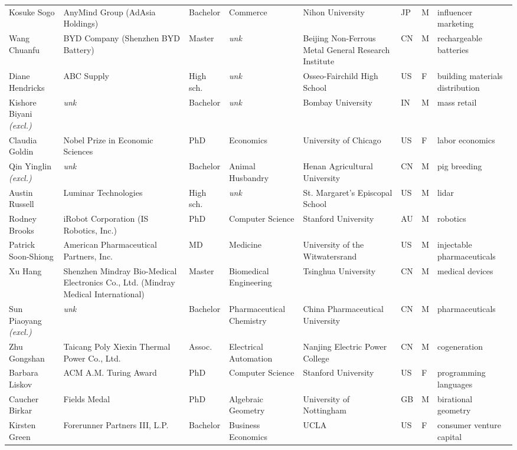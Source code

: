 \documentclass[11pt]{article}
\begin{document}
\begin{longtable}{@{}p{2.4cm}p{2.5cm}p{1.35cm}p{1.9cm}p{2.1cm}p{0.5cm}p{0.45cm}p{2.2cm}@{}}
Kosuke Sogo & AnyMind Group (AdAsia Holdings) & Bachelor & Commerce & Nihon University & JP & M & influencer marketing \\
Wang Chuanfu & BYD Company (Shenzhen BYD Battery) & Master & \textit{unk} & Beijing Non-Ferrous Metal General Research Institute & CN & M & rechargeable batteries \\
Diane Hendricks & ABC Supply & High sch. & \textit{unk} & Osseo-Fairchild High School & US & F & building materials distribution \\
Kishore Biyani \textit{\scriptsize(excl.)} & \textit{unk} & Bachelor & \textit{unk} & Bombay University & IN & M & mass retail \\
Claudia Goldin & Nobel Prize in Economic Sciences & PhD & Economics & University of Chicago & US & F & labor economics \\
Qin Yinglin \textit{\scriptsize(excl.)} & \textit{unk} & Bachelor & Animal Husbandry & Henan Agricultural University & CN & M & pig breeding \\
Austin Russell & Luminar Technologies & High sch. & \textit{unk} & St. Margaret's Episcopal School & US & M & lidar \\
Rodney Brooks & iRobot Corporation (IS Robotics, Inc.) & PhD & Computer Science & Stanford University & AU & M & robotics \\
Patrick Soon-Shiong & American Pharmaceutical Partners, Inc. & MD & Medicine & University of the Witwatersrand & US & M & injectable pharmaceuticals \\
Xu Hang & Shenzhen Mindray Bio-Medical Electronics Co., Ltd. (Mindray Medical International) & Master & Biomedical Engineering & Tsinghua University & CN & M & medical devices \\
Sun Piaoyang \textit{\scriptsize(excl.)} & \textit{unk} & Bachelor & Pharmaceutical Chemistry & China Pharmaceutical University & CN & M & pharmaceuticals \\
Zhu Gongshan & Taicang Poly Xiexin Thermal Power Co., Ltd. & Assoc. & Electrical Automation & Nanjing Electric Power College & CN & M & cogeneration \\
Barbara Liskov & ACM A.M. Turing Award & PhD & Computer Science & Stanford University & US & F & programming languages \\
Caucher Birkar & Fields Medal & PhD & Algebraic Geometry & University of Nottingham & GB & M & birational geometry \\
Kirsten Green & Forerunner Partners III, L.P. & Bachelor & Business Economics & UCLA & US & F & consumer venture capital \\

\end{longtable}
\end{document}

